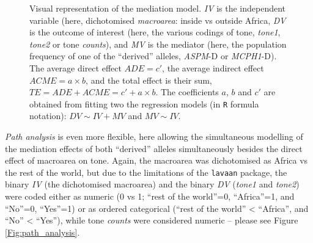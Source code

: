 \documentclass[twoside,onecolumn]{article}
\begin{document}
\begin{figure}[h]
  \centering


  \caption{Visual representation of the mediation model. \textit{IV} is the independent variable (here, dichotomised \textit{macroarea}: inside vs outside Africa, \textit{DV} is the outcome of interest (here, the various codings of tone, \textit{tone1}, \textit{tone2} or tone \textit{counts}), and \textit{MV} is the mediator (here, the population frequency of one of the ``derived'' alleles, \textit{ASPM}-D or \textit{MCPH1}-D). The average direct effect $ADE = c'$, the average indirect effect $ACME = a \times b$, and the total effect is their sum, $TE = ADE + ACME = c' + a \times b$. The coefficients $a$, $b$ and $c'$ are obtained from fitting two the regression models (in \texttt{R} formula notation): $DV \sim IV + MV$ and $MV \sim IV$.}
  \label{Fig:mediation_analysis}
\end{figure}

\emph{Path analysis} \citep{kline_principles_2011} is even more flexible, here allowing the simultaneous modelling of the mediation effects of both ``derived'' alleles simultaneously besides the direct effect of macroarea on tone.
Again, the macroarea was dichotomised as Africa vs the rest of the world, but due to the limitations of the \texttt{lavaan} package, the binary \textit{IV} (the dichotomised macroarea) and the binary \textit{DV} (\textit{tone1} and \textit{tone2}) were coded either as numeric (0 vs 1; ``rest of the world''=0, ``Africa''=1, and ``No''=0, ``Yes''=1) or as ordered categorical (``rest of the world'' < ``Africa'', and ``No'' < ``Yes''), while tone \textit{counts} were considered numeric -- please see Figure \ref{Fig:path_analysis}.
\end{document}
